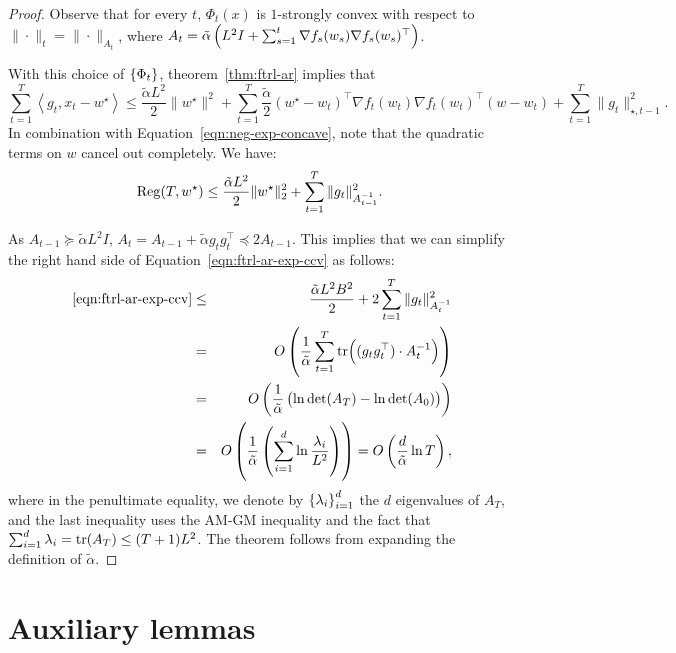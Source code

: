 \documentclass{article}
\DeclareMathOperator*{\Reg}{{\rm Reg}}
\newcommand{\inner}[2]{\left\langle #1,#2 \right\rangle}
\begin{document}
\begin{proof}
Observe that for every $t$, $\Phi_t(x)$ is $1$-strongly convex with respect to $\| \cdot \|_t = \| \cdot \|_{A_t}$, where $A_t = \tilde{\alpha} \del{L^2 I + \sum_{s=1}^t \nabla f_s(w_s) \nabla f_s(w_s)^\top}$.

With this choice of $\cbr{\Phi_t}$, theorem~\ref{thm:ftrl-ar} implies that
\[
\sum_{t=1}^T \inner{g_t}{x_t - w^\star} \leq \frac{\tilde{\alpha} L^2}2 \| w^\star\|^2 + \sum_{t=1}^T \frac{\tilde{\alpha}}{2}(w^\star - w_t)^\top \nabla f_t(w_t) \nabla f_t(w_t)^\top (w - w_t) + \sum_{t=1}^T \| g_t \|_{\star, t-1}^2.
\]
In combination with Equation~\eqref{eqn:neg-exp-concave}, note that the quadratic terms on $w$ cancel out completely.
We have:
\begin{equation}
  \Reg(T, w^\star) \leq \frac{\tilde{\alpha} L^2}2 \|w^\star\|_2^2 + \sum_{t=1}^T \| g_t \|_{A_{t-1}^{-1}}^2.
  \label{eqn:ftrl-ar-exp-ccv}
\end{equation}

As $A_{t-1} \succeq \tilde{\alpha} L^2 I$, $A_t = A_{t-1} + \tilde{\alpha} g_t g_t^\top \preceq 2 A_{t-1}$. This implies that we can simplify the right hand side of Equation~\eqref{eqn:ftrl-ar-exp-ccv} as follows:
\begin{eqnarray*}
~\eqref{eqn:ftrl-ar-exp-ccv} &\leq& \frac{\tilde{\alpha} L^2 B^2}{2} + 2 \sum_{t=1}^T \| g_t \|_{A_t^{-1}}^2 \\
&=& O \del{ \frac1{\tilde{\alpha}} \sum_{t=1}^T \tr( (g_t g_t^\top) \cdot A_t^{-1} ) } \\
&=& O \del{ \frac1{\tilde{\alpha}} \del{\ln \det( A_T ) - \ln \det (A_0)} } \\
&=& O \del{ \frac1{\tilde{\alpha}} \del{\sum_{i=1}^d \ln\frac{\lambda_i}{L^2}} } = O\del{ \frac{d}{\tilde{\alpha}} \ln T },
\end{eqnarray*}
where in the penultimate equality, we denote by $\cbr{\lambda_i}_{i=1}^d$ the $d$ eigenvalues of $A_T$, and the last inequality uses the AM-GM inequality and the fact that $\sum_{i=1}^d \lambda_i = \tr(A_T) \leq (T+1) L^2$. The theorem follows from expanding the definition of $\tilde{\alpha}$.
\end{proof}




\appendix

\section{Auxiliary lemmas}
\end{document}
